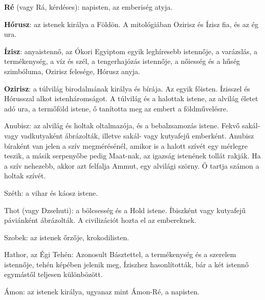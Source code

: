 \begin{compactitem}
	\item \textbf{Ré} (vagy Rá, kérdéses): napisten, az emberiség atyja.
	\item \textbf{Hórusz}: az istenek királya a Földön. A mitológiában Ozirisz és Ízisz fia, és az ég ura.
	\item \textbf{Ízisz}: anyaistennő, az Ókori Egyiptom egyik leghíresebb istennője, a varázslás, a termékenység, a víz és szél, a tengerhajózás istennője, a nőiesség és a hűség szimbóluma, Ozirisz felesége, Hórusz anyja.
	\item \textbf{Ozirisz}: a túlvilág birodalmának királya és bírája. Az egyik főisten. Ízisszel és Hórusszal alkot istenháromságot. A túlvilág és a halottak istene, az alvilág életet adó ura, a termőföld istene, ő tanította meg az embert a földművelésre.
	\item Anubisz: az alvilág és holtak oltalmazója, és a bebalzsamozás istene. Fekvő sakál- vagy vadkutyaként ábrázolták, illetve sakál- vagy kutyafejű emberként. Anubisz bíraként van jelen a szív megmérésénél, amikor is a halott szívét egy mérlegre teszik, a másik serpenyőbe pedig Maat-nak, az igazság istenének tollát rakják. Ha a szív nehezebb, akkor azt felfalja Ammut, egy alvilági szörny. Ő tartja számon a holtak szívét.
	\item Széth: a vihar és káosz istene.
	\item Thot (vagy Dzsehuti): a bölcsesség és a Hold istene. Íbiszként vagy kutyafejű páviánként ábrázolták. A civilizációt hozta el az embereknek.
	\item Szobek: az istenek őrzője, krokodilisten.
	\item Hathor, az Égi Tehén: Azonosult Básztettel, a termékenység és a szerelem istennője, tehén képében jelenik meg, Íziszhez hasonlították, bár a két istennő egymástől teljesen különbözött.
	\item Ámon: az istenek királya, ugyanaz mint Ámon-Ré, a napisten.
\end{compactitem}

\vspace{0.5cm}

